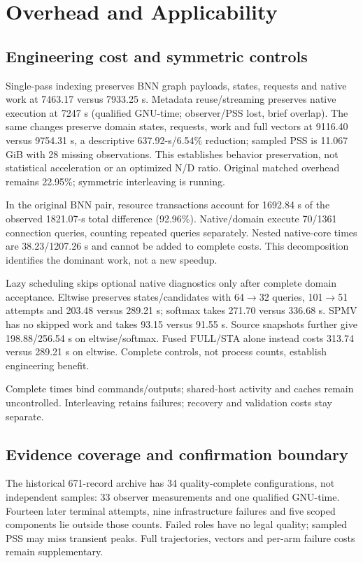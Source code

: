 \documentclass[conference,10pt]{IEEEtran}
\begin{document}
\section{Overhead and Applicability}
\subsection{Engineering cost and symmetric controls}
Single-pass indexing preserves BNN graph payloads, states, requests and native work at 7463.17 versus 7933.25 s. Metadata reuse/streaming preserves native execution at 7247 s (qualified GNU-time; observer/PSS lost, brief overlap). The same changes preserve domain states, requests, work and full vectors at 9116.40 versus 9754.31 s, a descriptive 637.92-s/6.54\% reduction; sampled PSS is 11.067 GiB with 28 missing observations. This establishes behavior preservation, not statistical acceleration or an optimized N/D ratio. Original matched overhead remains 22.95\%; symmetric interleaving is running.

In the original BNN pair, resource transactions account for 1692.84 s of the observed 1821.07-s total difference (92.96\%). Native/domain execute 70/1361 connection queries, counting repeated queries separately. Nested native-core times are 38.23/1207.26 s and cannot be added to complete costs. This decomposition identifies the dominant work, not a new speedup.

Lazy scheduling skips optional native diagnostics only after complete domain acceptance. Eltwise preserves states/candidates with 64$\to$32 queries, 101$\to$51 attempts and 203.48 versus 289.21 s; softmax takes 271.70 versus 336.68 s. SPMV has no skipped work and takes 93.15 versus 91.55 s. Source snapshots further give 198.88/256.54 s on eltwise/softmax. Fused FULL/STA alone instead costs 313.74 versus 289.21 s on eltwise. Complete controls, not process counts, establish engineering benefit.



Complete times bind commands/outputs; shared-host activity and caches remain uncontrolled. Interleaving retains failures; recovery and validation costs stay separate.

\subsection{Evidence coverage and confirmation boundary}
The historical 671-record archive has 34 quality-complete configurations, not independent samples: 33 observer measurements and one qualified GNU-time. Fourteen later terminal attempts, nine infrastructure failures and five scoped components lie outside those counts. Failed roles have no legal quality; sampled PSS may miss transient peaks. Full trajectories, vectors and per-arm failure costs remain supplementary.
\end{document}
